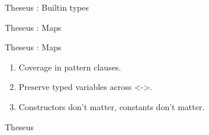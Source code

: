\documentclass[svgnames,11pt]{beamer}
\begin{document}
\begin{frame}[fragile]{Theseus : Builtin types}


\end{frame}

\begin{frame}[fragile]{Theseus : Maps}


\end{frame}

\begin{frame}[fragile]{Theseus : Maps}

\vfill

%

\pause
\vfill

\begin{enumerate}
\item Coverage in pattern clauses.
\item Preserve typed variables across {{<->}}.
\item Constructors don't matter, constants don't matter.
\end{enumerate}

\end{frame}

\begin{frame}[fragile]{Theseus}

%

\end{frame}
\end{document}
